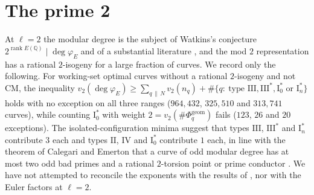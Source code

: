\documentclass[11pt]{amsart}
\theoremstyle{definition}
\newcommand{\Q}{\mathbb{Q}}
\newcommand{\degphi}{\deg\varphi_E}
\newcommand{\Phig}{\Phi^{\mathrm{geom}}}
\begin{document}
\section{The prime 2}\label{sec:two}
At $\ell=2$ the modular degree is the subject of Watkins's conjecture $2^{\operatorname{rank}E(\Q)}\mid\degphi$ \cite{Watkins02} and of a substantial literature \cite{Dummigan06,CalegariEmerton09,Yazdani11,CaroPasten22,HatleyKundu,BKP}, and the mod $2$ representation has a rational $2$-isogeny for a large fraction of curves. We record only the following. For working-set optimal curves without a rational $2$-isogeny and not CM, the inequality $v_2(\degphi)\ge\sum_{q\,\|\,N}v_2(n_q)+\#\{q:\ \text{type }\mathrm{III},\mathrm{III}^*,\mathrm{I}_0^*\text{ or }\mathrm{I}_n^*\}$ holds with no exception on all three ranges ($964{,}432$, $325{,}510$ and $313{,}741$ curves), while counting $\mathrm{I}_0^*$ with weight $2=v_2(\#\Phig_q)$ fails ($123$, $26$ and $20$ exceptions). The isolated-configuration minima suggest that types $\mathrm{III}$, $\mathrm{III}^*$ and $\mathrm{I}_n^*$ contribute $3$ each and types $\mathrm{II}$, $\mathrm{IV}$ and $\mathrm{I}_0^*$ contribute $1$ each, in line with the theorem of Calegari and Emerton that a curve of odd modular degree has at most two odd bad primes and a rational $2$-torsion point or prime conductor \cite{CalegariEmerton09}. We have not attempted to reconcile the exponents with the results of \cite{Dummigan06,CaroPasten22,HatleyKundu,BKP}, nor with the Euler factors at $\ell=2$.
\end{document}
